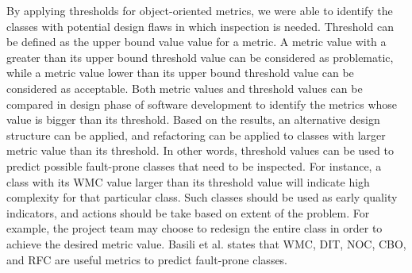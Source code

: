 By applying thresholds for object-oriented metrics, we were able to identify the classes with potential design flaws in which inspection is needed. Threshold can be defined as the upper bound value value for a metric. A metric value with a greater than its upper bound threshold value can be considered as problematic, while a metric value lower than its upper bound threshold value can be considered as acceptable. Both metric values and threshold values can be compared in design phase of software development to identify the metrics whose value is bigger than its threshold. Based on the results, an alternative design structure can be applied, and refactoring can be applied to classes with larger metric value than its threshold. In other words, threshold values can be used to predict possible fault-prone classes that need to be inspected. For instance, a class with its WMC value larger than its threshold value will indicate high complexity for that particular class. Such classes should be used as early quality indicators, and actions should be take based on extent of the problem. For example, the project team may choose to redesign the entire class in order to achieve the desired metric value. Basili et al.\cite{basili1996validation} states that WMC, DIT, NOC, CBO, and RFC are useful metrics to predict fault-prone classes. 






